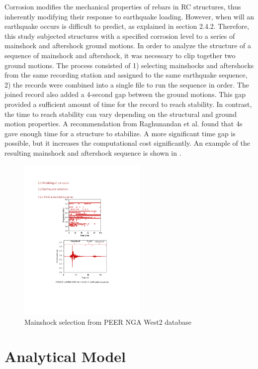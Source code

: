 Corrosion modifies the mechanical properties of rebars in RC structures, thus inherently modifying their response to earthquake loading. However, when will an earthquake occurs is difficult to predict, as explained in section 2.4.2. Therefore, this study subjected structures with a specified corrosion level to a series of mainshock and aftershock ground motions. 
In order to analyze the structure of a sequence of mainshock and aftershock, it was necessary to clip together two ground motions. The process consisted of 1) selecting mainshocks and aftershocks from the same recording station and assigned to the same earthquake sequence, 2) the records were combined into a single file to run the sequence in order. The joined record also added a 4-second gap between the ground motions. This gap provided a sufficient amount of time for the record to reach stability. In contrast, the time to reach stability can vary depending on the structural and ground motion properties. A recommendation from Raghunandan et al. \cite{Raghunandan2015} found that 4s gave enough time for a structure to stabilize. A more significant time gap is possible, but it increases the computational cost significantly. An example of the resulting mainshock and aftershock sequence is shown in .

\begin{figure}[htbp]
	\centering
	\includegraphics[width=0.55\textwidth]{Chapter-5/figs/MS_AS_Figure.pdf}
	\caption{Mainshock selection from PEER NGA West2 database}
	\label{fig:MS-AS_sequence_sample}
\end{figure}

\section{Analytical Model}
